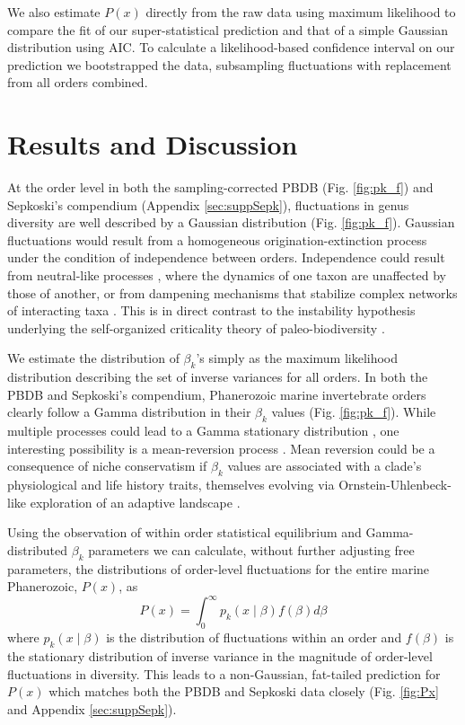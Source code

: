 \documentclass[11pt]{article}
\begin{document}
We also estimate $P(x)$ directly from the raw data using maximum
likelihood to compare the fit of our super-statistical prediction and
that of a simple Gaussian distribution using AIC. To calculate a
likelihood-based confidence interval on our prediction we bootstrapped
the data, subsampling fluctuations with replacement from all orders
combined.

\section{Results and Discussion}
At the order level in both the sampling-corrected PBDB
(Fig. \ref{fig:pk_f}) and Sepkoski's compendium (Appendix
\ref{sec:suppSepk}), fluctuations in genus diversity are well
described by a Gaussian distribution (Fig. \ref{fig:pk_f}). Gaussian
fluctuations would result from a homogeneous origination-extinction
process under the condition of independence between
orders. Independence could result from neutral-like processes
\citep{hubbell2001}, where the dynamics of one taxon are unaffected by
those of another, or from dampening mechanisms that stabilize complex
networks of interacting taxa \citep{brose2005}. This is in direct
contrast to the instability hypothesis underlying the self-organized
criticality theory of paleo-biodiversity \citep{bak1993, sole1997}.

We estimate the distribution of $\beta_k$'s simply as the maximum
likelihood distribution describing the set of inverse variances for
all orders. In both the PBDB and Sepkoski's compendium, Phanerozoic
marine invertebrate orders clearly follow a Gamma distribution in
their $\beta_k$ values (Fig. \ref{fig:pk_f}).  While multiple
processes could lead to a Gamma stationary distribution
\citep[e.g.][]{cir1985}, one interesting possibility is a
mean-reversion process \citep{cir1985}. Mean reversion could be a
consequence of niche conservatism if $\beta_k$ values are associated
with a clade's physiological and life history traits, themselves
evolving via Ornstein-Uhlenbeck-like exploration of an adaptive
landscape \citep{cir1985, butler2004}.

Using the observation of within order statistical equilibrium and
Gamma-distributed $\beta_k$ parameters we can calculate, without
further adjusting free parameters, the distributions of order-level
fluctuations for the entire marine Phanerozoic, $P(x)$, as
\begin{equation}
  P(x) = \int_0^\infty p_k(x \mid \beta) f(\beta) d\beta \label{eq:PxInt}
\end{equation}
where $p_k(x \mid \beta)$ is the distribution of fluctuations within
an order and $f(\beta)$ is the stationary distribution of inverse
variance in the magnitude of order-level fluctuations in
diversity. This leads to a non-Gaussian, fat-tailed prediction for
$P(x)$ which matches both the PBDB and Sepkoski data closely
(Fig. \ref{fig:Px} and Appendix \ref{sec:suppSepk}).
\end{document}
